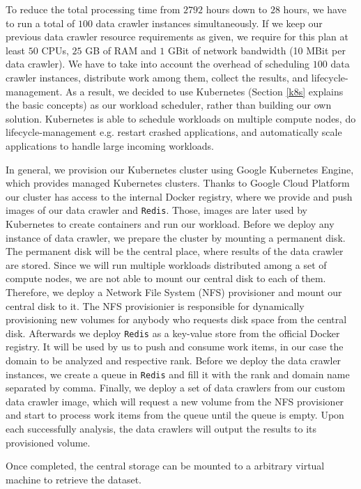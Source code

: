 To reduce the total processing time from $2792$ hours down to $28$ hours, we have to run a total of $100$ data crawler instances simultaneously. If we keep our previous data crawler resource requirements as given, we require for this plan at least $50$ CPUs, $25$ GB of RAM and $1$ GBit of network bandwidth (10 MBit per data crawler). We have to take into account the overhead of scheduling $100$ data crawler instances, distribute work among them, collect the results, and lifecycle-management. As a result, we decided to use Kubernetes (Section \ref{k8s} explains the basic concepts) as our workload scheduler, rather than building our own solution. Kubernetes is able to schedule workloads on multiple compute nodes, do lifecycle-management e.g. restart crashed applications, and automatically scale applications to handle large incoming workloads.

In general, we provision our Kubernetes cluster using Google Kubernetes Engine, which provides managed Kubernetes clusters. Thanks to Google Cloud Platform our cluster has access to the internal Docker registry, where we provide and push images of our data crawler and \texttt{Redis}. Those, images are later used by Kubernetes to create containers and run our workload. Before we deploy any instance of data crawler, we prepare the cluster by mounting a permanent disk. The permanent disk will be the central place, where results of the data crawler are stored. Since we will run multiple workloads distributed among a set of compute nodes, we are not able to mount our central disk to each of them. Therefore, we deploy a Network File System (NFS) provisioner and mount our central disk to it. The NFS provisionier is responsible for dynamically provisioning new volumes for anybody who requests disk space from the central disk. Afterwards we deploy \texttt{Redis} as a key-value store from the official Docker registry. It will be used by us to push and consume work items, in our case the domain to be analyzed and respective rank. Before we deploy the data crawler instances, we create a queue in \texttt{Redis} and fill it with the rank and domain name separated by comma. Finally, we deploy a set of data crawlers from our custom data crawler image, which will request a new volume from the NFS provisioner and start to process work items from the queue until the queue is empty. Upon each successfully analysis, the data crawlers will output the results to its provisioned volume.

Once completed, the central storage can be mounted to a arbitrary virtual machine to retrieve the dataset. 

